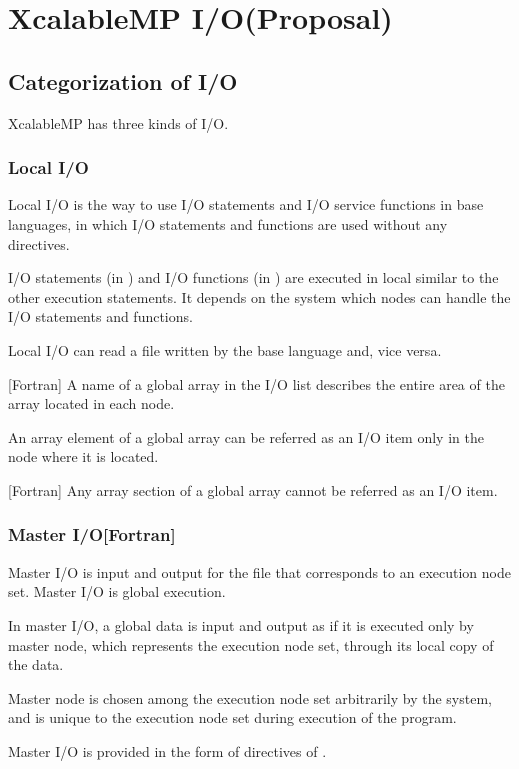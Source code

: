 
 \chapter{XcalableMP I/O(Proposal)}

 \section{Categorization of I/O}
 XcalableMP has three kinds of I/O.

  \subsection{Local I/O}

  Local I/O is the way to use I/O statements and I/O service functions in
  base languages, in which I/O statements and functions are used without
  any directives.

  I/O statements (in {\XMP} {\Fort}) and I/O functions (in {\XMP} {\C})
  are executed in local similar to the other execution statements.
  It depends on the system which nodes can handle the I/O statements and
  functions.

  Local I/O can read a file written by the base language and, vice
  versa.

  [Fortran] A name of a global array in the I/O list describes the
  entire area of the array located in each node.

  An array element of a global array can be referred as an I/O item only
  in the node where it is located.

  [Fortran] Any array section of a global array cannot be referred as an
  I/O item.

  \subsection{Master I/O[Fortran]}

  Master I/O is input and output for the file that corresponds to an
  execution node set.
  Master I/O is global execution.

  In master I/O, a global data is input and output as if it is executed
  only by master node, which represents the execution node set, through
  its local copy of the data.

  Master node is chosen among the execution node set arbitrarily by the
  system, and is unique to the execution node set during execution of
  the program.

  Master I/O is provided in the form of directives of {\XMP} {\Fort}.


